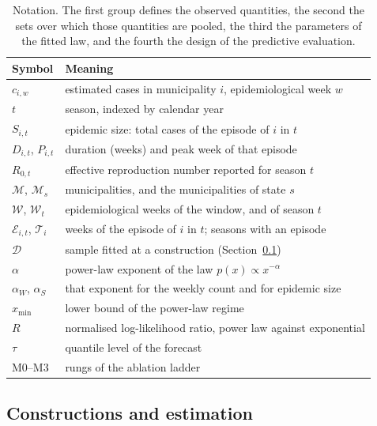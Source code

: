 \documentclass[english,10pt,b5paper]{article}
\begin{document}
\begin{table}[htbp]
\centering
\small
\setlength{\tabcolsep}{5pt}
\caption{Notation. The first group defines the observed quantities, the second
the sets over which those quantities are pooled, the third the parameters of the
fitted law, and the fourth the design of the predictive evaluation.}
\label{tab:notation}
\begin{tabular}{@{}ll@{}}
\toprule
Symbol & Meaning\\
\midrule
$c_{i,w}$ & estimated cases in municipality $i$, epidemiological week $w$\\
$t$ & season, indexed by calendar year\\
$S_{i,t}$ & epidemic size: total cases of the episode of $i$ in $t$\\
$D_{i,t}$, $P_{i,t}$ & duration (weeks) and peak week of that episode\\
$R_{0,t}$ & effective reproduction number reported for season $t$\\
\midrule
$\mathcal{M}$, $\mathcal{M}_s$ & municipalities, and the municipalities of state $s$\\
$\mathcal{W}$, $\mathcal{W}_t$ & epidemiological weeks of the window, and of season $t$\\
$\mathcal{E}_{i,t}$, $\mathcal{T}_i$ & weeks of the episode of $i$ in $t$; seasons with an episode\\
$\mathcal{D}$ & sample fitted at a construction (Section~\ref{sec:levels})\\
\midrule
$\alpha$ & power-law exponent of the law $p(x)\propto x^{-\alpha}$\\
$\alpha_W$, $\alpha_S$ & that exponent for the weekly count and for epidemic size\\
$x_{\min}$ & lower bound of the power-law regime\\
$R$ & normalised log-likelihood ratio, power law against exponential\\
\midrule
$\tau$ & quantile level of the forecast\\
M0--M3 & rungs of the ablation ladder\\
\bottomrule
\end{tabular}
\end{table}

\subsection{Constructions and estimation}
\label{sec:levels}
\label{sec:estimation}
\label{sec:comparison}
\label{sec:diagnostic}
\end{document}
